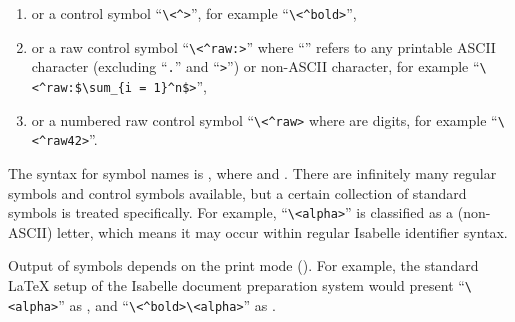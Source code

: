 \begin{isabellebody}
\begin{isamarkuptext}
\begin{enumerate}
\item or a control symbol ``\verb,\,\verb,<^,\verb,>,'', for example ``\verb,\,\verb,<^bold>,'',

\item or a raw control symbol ``\verb,\,\verb,<^raw:,\isa{{\isasymdots}}\verb,>,'' where ``\isa{{\isasymdots}}'' refers to any
printable ASCII character (excluding ``\verb,.,'' and ``\verb,>,'') or
non-ASCII character, for example ``\verb,\,\verb,<^raw:$\sum_{i = 1}^n$>,'',

\item or a numbered raw control symbol ``\verb,\,\verb,<^raw,\verb,>, where  are digits, for example
``\verb,\,\verb,<^raw42>,''.

\end{enumerate}

The  syntax for symbol names is , where  and .  There are infinitely many regular symbols and
control symbols available, but a certain collection of standard
symbols is treated specifically.  For example,
``\verb,\,\verb,<alpha>,'' is classified as a (non-ASCII) letter,
which means it may occur within regular Isabelle identifier syntax.

Output of symbols depends on the print mode ().
For example, the standard {\LaTeX} setup of the Isabelle document
preparation system would present ``\verb,\,\verb,<alpha>,'' as \isa{{\isasymalpha}}, and ``\verb,\,\verb,<^bold>,\verb,\,\verb,<alpha>,'' as \isa{\isactrlbold {\isasymalpha}}.


\end{isamarkuptext}
\end{isabellebody}
